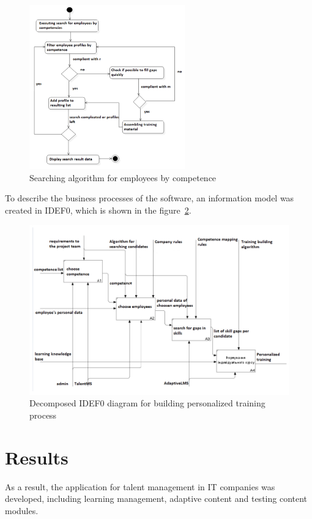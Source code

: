\documentclass[a4paper,14pt,oneside,final]{extarticle}
\begin{document}
\begin{figure}[H]
    \centering
    \includegraphics[width=0.6\textwidth]{fig3}
    \caption{Searching algorithm for employees by competence}
    \label{fig:3}
\end{figure}

To describe the business processes of the software, an information model was created in IDEF0, which is shown in the figure~\ref{fig:4}.

\begin{figure}[H]
    \centering
    \includegraphics[width=1\textwidth]{fig4}
    \caption{Decomposed IDEF0 diagram for building personalized training process}
    \label{fig:4}
\end{figure}

\section{Results}
As a result, the application for talent management in IT companies was developed, including learning management, adaptive content and testing content modules. 
\end{document}
